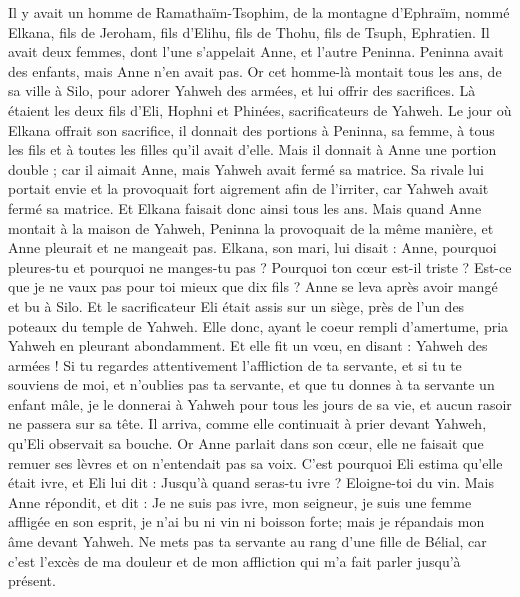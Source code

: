 \begin{multicols}{2}
\VerseOne{}Il y avait un homme de Ramathaïm-Tsophim, de la montagne d'Ephraïm, nommé Elkana, fils de Jeroham, fils d'Elihu, fils de Thohu, fils de Tsuph, Ephratien.
Il avait deux femmes, dont l'une s'appelait Anne, et l'autre Peninna. Peninna avait des enfants, mais Anne n'en avait pas.
Or cet homme-là montait tous les ans, de sa ville à Silo, pour adorer Yahweh des armées, et lui offrir des sacrifices. Là étaient les deux fils d'Eli, Hophni et Phinées, sacrificateurs de Yahweh.
Le jour où Elkana offrait son sacrifice, il donnait des portions à Peninna, sa femme, à tous les fils et à toutes les filles qu'il avait d'elle.
Mais il donnait à Anne une portion double ; car il aimait Anne, mais Yahweh avait fermé sa matrice.
Sa rivale lui portait envie et la provoquait fort aigrement afin de l'irriter, car Yahweh avait fermé sa matrice.
Et Elkana faisait donc ainsi tous les ans. Mais quand Anne montait à la maison de Yahweh, Peninna la provoquait de la même manière, et Anne pleurait et ne mangeait pas.
Elkana, son mari, lui disait : Anne, pourquoi pleures-tu et pourquoi ne manges-tu pas ? Pourquoi ton cœur est-il triste ? Est-ce que je ne vaux pas pour toi mieux que dix fils ?
Anne se leva après avoir mangé et bu à Silo. Et le sacrificateur Eli était assis sur un siège, près de l'un des poteaux du temple de Yahweh.
Elle donc, ayant le coeur rempli d'amertume, pria Yahweh en pleurant abondamment.
Et elle fit un vœu, en disant : Yahweh des armées ! Si tu regardes attentivement l'affliction de ta servante, et si tu te souviens de moi, et n'oublies pas ta servante, et que tu donnes à ta servante un enfant mâle, je le donnerai à Yahweh pour tous les jours de sa vie, et aucun rasoir ne passera sur sa tête.
Il arriva, comme elle continuait à prier devant Yahweh, qu'Eli observait sa bouche.
Or Anne parlait dans son cœur, elle ne faisait que remuer ses lèvres et on n'entendait pas sa voix. C'est pourquoi Eli estima qu'elle était ivre,
et Eli lui dit : Jusqu'à quand seras-tu ivre ? Eloigne-toi du vin.
Mais Anne répondit, et dit : Je ne suis pas ivre, mon seigneur, je suis une femme affligée en son esprit, je n'ai bu ni vin ni boisson forte; mais je répandais mon âme devant Yahweh.
Ne mets pas ta servante au rang d'une fille de Bélial, car c'est l'excès de ma douleur et de mon affliction qui m'a fait parler jusqu'à présent.

\end{multicols}
